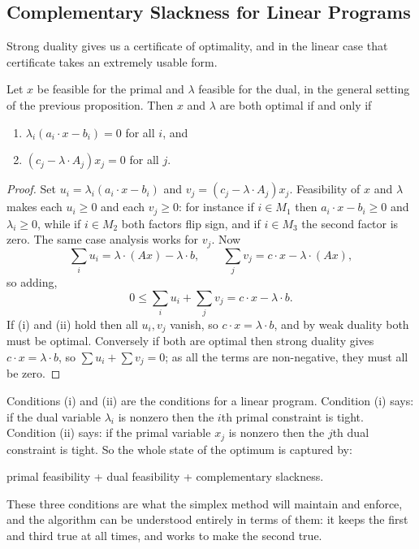 \subsection{Complementary Slackness for Linear Programs}

Strong duality gives us a certificate of optimality, and in the linear case that certificate takes an extremely usable form.

\begin{theorem}
    Let $x$ be feasible for the primal and $\lambda$ feasible for the dual, in the general setting of the previous proposition. Then $x$ and $\lambda$ are both optimal if and only if
    \begin{enumerate}[label=(\roman*)]
        \item $\lambda_i(a_i\cdot x - b_i) = 0$ for all $i$, and
        \item $(c_j - \lambda\cdot A_j)x_j = 0$ for all $j$.
    \end{enumerate}
\end{theorem}
\begin{proof}
    Set $u_i = \lambda_i(a_i\cdot x - b_i)$ and $v_j = (c_j - \lambda\cdot A_j)x_j$. Feasibility of $x$ and $\lambda$ makes each $u_i \geq 0$ and each $v_j \geq 0$: for instance if $i \in M_1$ then $a_i\cdot x - b_i \geq 0$ and $\lambda_i \geq 0$, while if $i \in M_2$ both factors flip sign, and if $i \in M_3$ the second factor is zero. The same case analysis works for $v_j$. Now
    $$
    \sum_i u_i = \lambda\cdot(Ax) - \lambda\cdot b, \qquad \sum_j v_j = c\cdot x - \lambda \cdot (Ax),
    $$
    so adding,
    $$
    0 \leq \sum_i u_i + \sum_j v_j = c\cdot x - \lambda\cdot b.
    $$
    If (i) and (ii) hold then all $u_i, v_j$ vanish, so $c\cdot x = \lambda\cdot b$, and by weak duality both must be optimal. Conversely if both are optimal then strong duality gives $c\cdot x = \lambda\cdot b$, so $\sum u_i + \sum v_j = 0$; as all the terms are non-negative, they must all be zero.
\end{proof}

Conditions (i) and (ii) are the  conditions for a linear program. Condition (i) says: if the dual variable $\lambda_i$ is nonzero then the $i$th primal constraint is tight. Condition (ii) says: if the primal variable $x_j$ is nonzero then the $j$th dual constraint is tight. So the whole state of the optimum is captured by:
\begin{center}
    primal feasibility \quad + \quad dual feasibility \quad + \quad complementary slackness.
\end{center}
These three conditions are what the simplex method will maintain and enforce, and the algorithm can be understood entirely in terms of them: it keeps the first and third true at all times, and works to make the second true.

